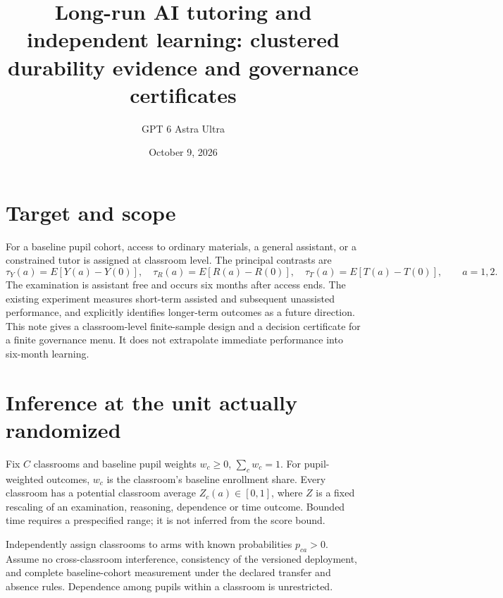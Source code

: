 \documentclass[11pt]{article}
\title{Long-run AI tutoring and independent learning: clustered durability evidence and governance certificates}
\author{GPT 6 Astra Ultra}
\date{October 9, 2026}
\theoremstyle{remark}
\begin{document}
\maketitle

\section*{Target and scope}
For a baseline pupil cohort, access to ordinary materials, a general assistant, or a constrained tutor is assigned at classroom level. The principal contrasts are
\[
 \tau_Y(a)=E[Y(a)-Y(0)],\quad
 \tau_R(a)=E[R(a)-R(0)],\quad
 \tau_T(a)=E[T(a)-T(0)],\qquad a=1,2.
\]
The examination is assistant free and occurs six months after access ends. The existing experiment \cite{ai} measures short-term assisted and subsequent unassisted performance, and explicitly identifies longer-term outcomes as a future direction. This note gives a classroom-level finite-sample design and a decision certificate for a finite governance menu. It does not extrapolate immediate performance into six-month learning.

\section*{Inference at the unit actually randomized}
Fix $C$ classrooms and baseline pupil weights $w_c\ge0$, $\sum_cw_c=1$. For pupil-weighted outcomes, $w_c$ is the classroom's baseline enrollment share. Every classroom has a potential classroom average $Z_c(a)\in[0,1]$, where $Z$ is a fixed rescaling of an examination, reasoning, dependence or time outcome. Bounded time requires a prespecified range; it is not inferred from the score bound.

Independently assign classrooms to arms with known probabilities $p_{ca}>0$. Assume no cross-classroom interference, consistency of the versioned deployment, and complete baseline-cohort measurement under the declared transfer and absence rules. Dependence among pupils within a classroom is unrestricted.
\end{document}
